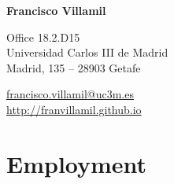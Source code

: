 \documentclass[a4paper, 12pt]{article}
\begin{document}

\begin{center}
{\bfseries\Large Francisco Villamil}
\end{center}

\vspace{0pt}

\noindent
\begin{minipage}[t]{0.47\textwidth}\small
\flushright
	Office 18.2.D15\\
	Universidad Carlos III de Madrid\\
	Madrid, 135 -- 28903 Getafe\\
\end{minipage}\hfill
\begin{minipage}[t]{0.47\textwidth}\small
	\vfill
	 \hspace{5pt} \href{mailto:francisco.villamil@uc3m.es}{francisco.villamil@uc3m.es}\\
	 \hspace{5pt} \href{http://franvillamil.github.io}{http://franvillamil.github.io}\\
\end{minipage}


\vspace{-10pt}
\section*{Employment}
\end{document}
